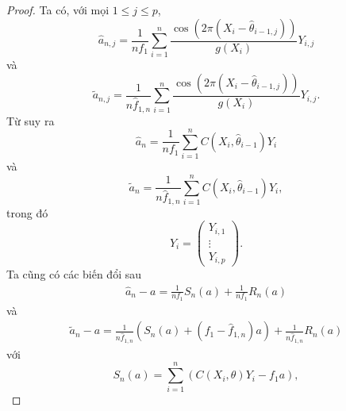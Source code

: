 \begin{proof}
    Ta có, với mọi $1 \leq j \leq p$,
$$
\widehat{a}_{n, j}=\frac{1}{n f_{1}} \sum_{i=1}^{n} \frac{\cos \left(2 \pi\left(X_{i}-\widehat{\theta}_{i-1, j}\right)\right)}{g\left(X_{i}\right)} Y_{i, j}
$$
và
$$
\widetilde{a}_{n, j}=\frac{1}{n \widehat{f}_{1, n}} \sum_{i=1}^{n} \frac{\cos \left(2 \pi\left(X_{i}-\widehat{\theta}_{i-1, j}\right)\right)}{g\left(X_{i}\right)} Y_{i, j}.
$$
Từ  suy ra
$$
\widehat{a}_{n}=\frac{1}{n f_{1}} \sum_{i=1}^{n} C\left(X_{i}, \widehat{\theta}_{i-1}\right) Y_{i}
$$
và
$$
\widetilde{a}_{n}=\frac{1}{n \widehat{f}_{1, n}} \sum_{i=1}^{n} C\left(X_{i}, \widehat{\theta}_{i-1}\right) Y_{i},
$$
trong đó
$$
Y_{i}=\left(\begin{array}{c}
Y_{i, 1} \\
\vdots \\
Y_{i, p}
\end{array}\right).
$$
Ta cũng có các biến đổi sau
\begin{align}
    \widehat{a}_{n}-a=\frac{1}{n f_{1}} S_{n}(a)+\frac{1}{n f_{1}} R_{n}(a)
    \label{8.13}
\end{align}
và
\begin{align}
    \widetilde{a}_{n}-a=\frac{1}{n \widehat{f}_{1, n}}\left(S_{n}(a)+\left(f_{1}-\widehat{f}_{1, n}\right) a\right)+\frac{1}{n \widehat{f}_{1, n}} R_{n}(a)
    \label{8.14}
\end{align}
với
$$
S_{n}(a)=\sum_{i=1}^{n}\left(C\left(X_{i}, \theta\right) Y_{i}-f_{1} a\right),
$$


\end{proof}

